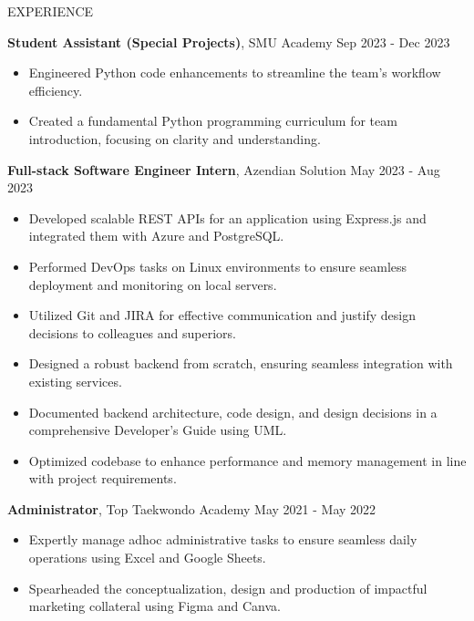 \documentclass{resume} %
\begin{document}
\begin{rSection}{EXPERIENCE}

\textbf{Student Assistant (Special Projects)}, SMU Academy \hfill Sep 2023 - Dec 2023\\
 \vspace{-1.25em}
 \begin{itemize}
    \itemsep -5pt {} 
     \item {Engineered Python code enhancements to streamline the team's workflow efficiency.}
     \item {Created a fundamental Python programming curriculum for team introduction, focusing on clarity and understanding.}
 \end{itemize}

\textbf{Full-stack Software Engineer Intern}, Azendian Solution \hfill May 2023 - Aug 2023\\
 \vspace{-1.25em}
 \begin{itemize}
    \itemsep -5pt {} 
     \item {Developed scalable REST APIs for an application using Express.js and integrated them with Azure and PostgreSQL.}
     \item {Performed DevOps tasks on Linux environments to ensure seamless deployment and monitoring on local servers.}
     \item {Utilized Git and JIRA for effective communication and justify design decisions to colleagues and superiors.}
     \item {Designed a robust backend from scratch, ensuring seamless integration with existing services.}
     \item {Documented backend architecture, code design, and design decisions in a comprehensive Developer's Guide using UML.}
     \item {Optimized codebase to enhance performance and memory management in line with project requirements.}
 \end{itemize}

\textbf{Administrator}, Top Taekwondo Academy \hfill May 2021 - May 2022\\
 \vspace{-1.25em}
 \begin{itemize}
    \itemsep -5pt {} 
     \item {Expertly manage adhoc administrative tasks to ensure seamless daily operations using Excel and Google Sheets.}
     \item {Spearheaded the conceptualization, design and production of impactful marketing collateral using Figma and Canva.}
 \end{itemize}

\end{rSection} 
\end{document}
